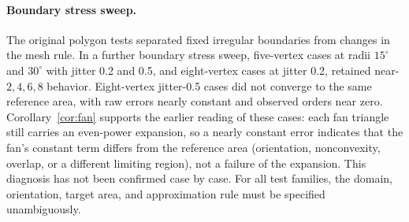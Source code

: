 \documentclass[11pt]{article}
\theoremstyle{remark}
\begin{document}
\paragraph{Boundary stress sweep.}
The original polygon tests separated fixed irregular boundaries from changes in the mesh rule.
In a further boundary stress sweep, five-vertex cases at radii $15^\circ$ and $30^\circ$ with
jitter 0.2 and 0.5, and eight-vertex cases at jitter 0.2, retained near-$2,4,6,8$ behavior.
Eight-vertex jitter-0.5 cases did not converge to the same reference area, with raw errors
nearly constant and observed orders near zero. Corollary~\ref{cor:fan} supports the earlier
reading of these cases: each fan triangle still carries an even-power expansion, so a nearly
constant error indicates that the fan's constant term differs from the reference area
(orientation, nonconvexity, overlap, or a different limiting region), not a failure of the
expansion. This diagnosis has not been confirmed case by case. For all test families, the
domain, orientation, target area, and approximation rule must be specified unambiguously.

\end{document}
